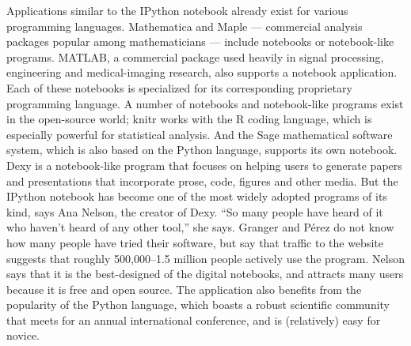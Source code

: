Applications similar to the IPython notebook
already exist for various programming
languages. Mathematica and Maple — commercial
analysis packages popular among mathematicians
— include notebooks or notebook-like
programs. MATLAB, a commercial package
used heavily in signal processing, engineering
and medical-imaging research, also supports a
notebook application. Each of these notebooks
is specialized for its corresponding proprietary
programming language.
A number of notebooks and notebook-like
programs exist in the open-source world; knitr
works with the R coding language, which is
especially powerful for statistical analysis. And
the Sage mathematical software system, which
is also based on the Python language, supports
its own notebook. Dexy is a notebook-like program
that focuses on helping users to generate
papers and presentations that incorporate prose,
code, figures and other media.
But the IPython notebook has become one
of the most widely adopted programs of its
kind, says Ana Nelson, the creator of Dexy. “So
many people have heard of it who haven’t heard
of any other tool,” she says. Granger and Pérez
do not know how many people have tried their
software, but say that traffic to the website suggests
that roughly 500,000–1.5 million people
actively use the program. Nelson says that it is
the best-designed of the digital notebooks, and
attracts many users because it is free and open
source. The application also benefits from the
popularity of the Python language, which boasts
a robust scientific community that meets for an
annual international conference, and is (relatively)
easy for novice.

